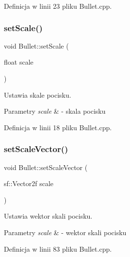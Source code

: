Definicja w linii 23 pliku Bullet.\+cpp.

\mbox{\label{class_bullet_a34f6859e7b7e11fef77acbe8c58e84f8}} 
\subsubsection{\texorpdfstring{set\+Scale()}{setScale()}}
{\footnotesize\ttfamily void Bullet\+::set\+Scale (\begin{DoxyParamCaption}\item[{float}]{scale }\end{DoxyParamCaption})}



Ustawia skale pocisku. 


\begin{DoxyParams}{Parametry}
{\em scale} & -\/ skala pocisku \\
\hline
\end{DoxyParams}


Definicja w linii 18 pliku Bullet.\+cpp.

\mbox{\label{class_bullet_ae6b6d87e11805a0e76f04fb7187d674e}} 
\subsubsection{\texorpdfstring{set\+Scale\+Vector()}{setScaleVector()}}
{\footnotesize\ttfamily void Bullet\+::set\+Scale\+Vector (\begin{DoxyParamCaption}\item[{sf\+::\+Vector2f}]{scale }\end{DoxyParamCaption})}



Ustawia wektor skali pocisku. 


\begin{DoxyParams}{Parametry}
{\em scale} & -\/ wektor skali pocisku \\
\hline
\end{DoxyParams}


Definicja w linii 83 pliku Bullet.\+cpp.

\mbox{\label{class_bullet_a1a518fd30f6af391e54d6e4fe1382bf9}} 
